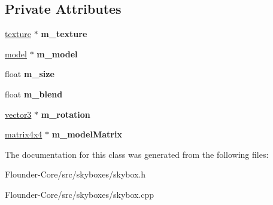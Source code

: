 \subsection*{Private Attributes}
\begin{DoxyCompactItemize}
\item 
\mbox{\label{classflounder_1_1skybox_a7f446515bdea0a6341fac3f961e9707b}} 
\hyperlink{classflounder_1_1texture}{texture} $\ast$ {\bfseries m\+\_\+texture}
\item 
\mbox{\label{classflounder_1_1skybox_a8533ad0cefb38d6868f415656aaf14b3}} 
\hyperlink{classflounder_1_1model}{model} $\ast$ {\bfseries m\+\_\+model}
\item 
\mbox{\label{classflounder_1_1skybox_a86732f5bf985dbade5e0267b00864146}} 
float {\bfseries m\+\_\+size}
\item 
\mbox{\label{classflounder_1_1skybox_a09c5b61727e96dfd822d95255d23badc}} 
float {\bfseries m\+\_\+blend}
\item 
\mbox{\label{classflounder_1_1skybox_a7ca62d998df7042053987dfb219500fc}} 
\hyperlink{classflounder_1_1vector3}{vector3} $\ast$ {\bfseries m\+\_\+rotation}
\item 
\mbox{\label{classflounder_1_1skybox_a149b6fde2e5d6c91cbb7dda23e018660}} 
\hyperlink{classflounder_1_1matrix4x4}{matrix4x4} $\ast$ {\bfseries m\+\_\+model\+Matrix}
\end{DoxyCompactItemize}


The documentation for this class was generated from the following files\+:\begin{DoxyCompactItemize}
\item 
Flounder-\/\+Core/src/skyboxes/skybox.\+h\item 
Flounder-\/\+Core/src/skyboxes/skybox.\+cpp\end{DoxyCompactItemize}
